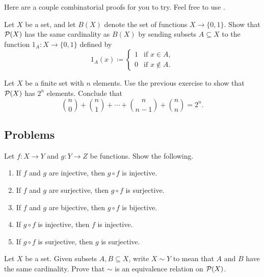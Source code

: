\documentclass[../notes.tex]{subfiles}
\begin{document}
Here are a couple combinatorial proofs for you to try. Feel free to use .
\begin{exercise} \label{exe:pset-is-2x}
    Let $X$ be a set, and let $B(X)$ denote the set of functions $X \to \{0, 1\}$. Show that $\mathcal{P}(X)$ has the same cardinality as $B(X)$ by sending subsets $A\subseteq X$ to the function $1_A\colon X\to\{0,1\}$ defined by
    \[1_A(x)\coloneqq\begin{cases}
        1 & \text{if }x\in A, \\
        0 & \text{if }x\notin A.
    \end{cases}\]
\end{exercise}
\begin{exe}
    Let $X$ be a finite set with $n$ elements. Use the previous exercise to show that $\mathcal{P}(X)$ has $2^n$ elements. Conclude that
    \[\binom n0+\binom n1+\cdots+\binom n{n-1}+\binom nn=2^n.\]
\end{exe}


    
\subsection{Problems}

\begin{homework} \label{prob:compose-injs-surjs}
    Let $f\colon X \to Y$ and $g\colon Y \to Z$ be functions. Show the following.
    \begin{enumerate}[label=(\alph*)]
        \item If $f$ and $g$ are injective, then $g \circ f$ is injective.
        \item If $f$ and $g$ are surjective, then $g \circ f$ is surjective.
        \item If $f$ and $g$ are bijective, then $g \circ f$ is bijective.
        \item If $g\circ f$ is injective, then $f$ is injective.
        \item If $g\circ f$ is surjective, then $g$ is surjective.
    \end{enumerate}
\end{homework}

\begin{homework} \label{isomorphism of sets}
    Let $X$ be a set. Given subsets $A,B\subseteq X$, write $X \sim Y$ to mean that $A$ and $B$ have the same cardinality. Prove that $\sim$ is an equivalence relation on $\mathcal{P}(X)$. %
\end{homework}
\end{document}
